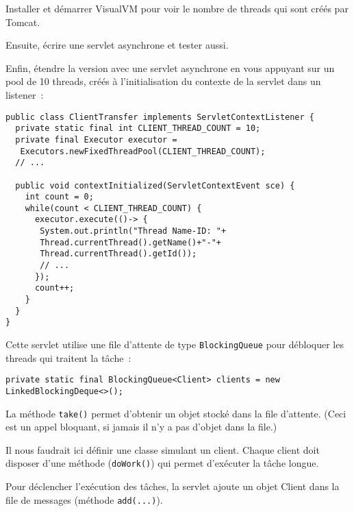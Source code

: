 \documentclass[11pt]{article}
\begin{document}
Installer et démarrer VisualVM pour voir le nombre de threads qui sont créés par Tomcat.

Ensuite, écrire une servlet asynchrone et tester aussi.

Enfin, étendre la version avec une servlet asynchrone en vous appuyant sur un pool de 10 threads, créés à l'initialisation du contexte de la servlet dans un listener~:

\begin{lstlisting}
public class ClientTransfer implements ServletContextListener {
  private static final int CLIENT_THREAD_COUNT = 10;
  private final Executor executor =
   Executors.newFixedThreadPool(CLIENT_THREAD_COUNT);
  // ...

  public void contextInitialized(ServletContextEvent sce) {
    int count = 0;
    while(count < CLIENT_THREAD_COUNT) {
      executor.execute(()-> {
       System.out.println("Thread Name-ID: "+
       Thread.currentThread().getName()+"-"+
       Thread.currentThread().getId());
       // ...
      });
      count++;
	}
  }
}
\end{lstlisting}

Cette servlet utilise une file d'attente de type \texttt{BlockingQueue} pour débloquer les threads qui traitent la tâche~:
\begin{lstlisting}
private static final BlockingQueue<Client> clients = new LinkedBlockingDeque<>();
\end{lstlisting}

La méthode \texttt{take()} permet d'obtenir un objet stocké dans la file d'attente. (Ceci est un appel bloquant, si jamais il n'y a pas d'objet dans la file.)

Il nous faudrait ici définir une classe simulant un client. Chaque client doit disposer d'une méthode (\texttt{doWork()}) qui permet d'exécuter la tâche longue.

Pour déclencher l'exécution des tâches, la servlet ajoute un objet Client dans la file de messages (méthode \texttt{add(...)}).
\end{document}

